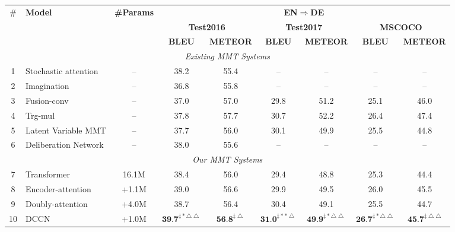 \documentclass[sigconf]{acmart}
\begin{document}
\begin{table*}[!t]
\centering
\footnotesize
\begin{tabular}{c|l|c|cc|cc|cc}
\hline
\multirow{3}{*}{\#} & \multirow{3}{*}{\bf Model} & \multirow{3}{*}{\bf\#Params} &\multicolumn{6}{c}{\textbf{EN$\Rightarrow$DE}}\\
\cline{4-9}
& & &\multicolumn{2}{|c|}{\textbf{Test2016}}  &\multicolumn{2}{|c|}{\textbf{Test2017}}  &\multicolumn{2}{c}{\textbf{MSCOCO}}\\
\cline{4-9}
& & &\textbf{BLEU} & \textbf{METEOR} &\textbf{BLEU} & \textbf{METEOR}  &\textbf{BLEU} & \textbf{METEOR}\\
\hline
\hline
\multicolumn{9}{c}{\emph{Existing MMT Systems}} \\
\hline
1  &Stochastic attention \cite{Delbrouck:EMNLP17}        &--   & 38.2 & 55.4  & --   & --    & --   & -- \\
2  &Imagination \cite{elliott2017imagination}            &--   & 36.8 & 55.8  & --   & --    & --   & -- \\
3  &Fusion-conv \cite{caglayan2017lium}                  &--   & 37.0 & 57.0  & 29.8 & 51.2  & 25.1 & 46.0 \\
4  &Trg-mul \cite{caglayan2017lium}                      &--   & 37.8 & 57.7  & 30.7 & 52.2  & 26.4 & 47.4 \\
5  &Latent Variable MMT \cite{calixto2019latent}         &--   & 37.7 & 56.0  & 30.1 & 49.9  & 25.5 & 44.8 \\
6  &Deliberation Network \cite{acl19:twopass}            &--   & 38.0 & 55.6  & --   & --    & --   & -- \\
\hline
\multicolumn{9}{c}{\emph{Our MMT Systems}} \\
\hline
7  &Transformer \cite{vaswani2017attention}            & 16.1M & 38.4 & 56.0   & 29.4 & 48.8    & 25.3 & 44.4 \\
8 &Encoder-attention \cite{Delbrouck:NIPS17workshop}   & +1.1M & 39.0 & 56.6   & 29.9 & 49.5      & 26.0 & 45.5 \\
9 &Doubly-attention \cite{helcl2018cuni}               & +4.0M & 38.7 & 56.4   & 30.4 & 49.1      & 25.5 & 44.7 \\	
\hline
10 &DCCN  & +1.0M 
& $\textbf{39.7}^{\ddagger*\bigtriangleup\bigtriangleup}$ & $ \textbf{56.8}^{\ddagger\bigtriangleup}$   
& $\textbf{31.0}^{\ddagger**\bigtriangleup}$ & $ \textbf{49.9}^{\ddagger*\bigtriangleup\bigtriangleup}$   
& $\textbf{26.7}^{\ddagger*\bigtriangleup\bigtriangleup}$  & $ \textbf{45.7}^{\ddagger\bigtriangleup\bigtriangleup}$  \\

\end{tabular}
\end{table*}
\end{document}
